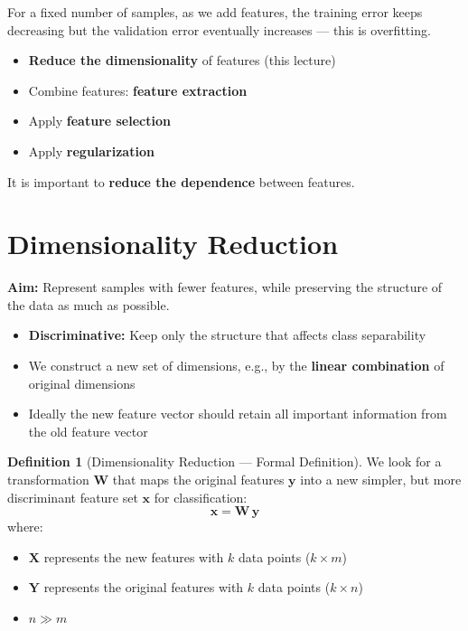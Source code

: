 \documentclass[11pt,a4paper]{article}
\theoremstyle{definition}
\newtheorem{definition}{Definition}[section]
\theoremstyle{plain}
\theoremstyle{remark}
\begin{document}
For a fixed number of samples, as we add features, the training error keeps decreasing but the validation error eventually increases --- this is overfitting.

\begin{tcolorbox}[colback=blue!5!white,colframe=blue!75!black,title=\textbf{Mitigating Overfitting and the Curse of Dimensionality}]
\begin{itemize}
    \item \textbf{Reduce the dimensionality} of features (this lecture)
    \item Combine features: \textbf{feature extraction}
    \item Apply \textbf{feature selection}
    \item Apply \textbf{regularization}
\end{itemize}
It is important to \textbf{reduce the dependence} between features.
\end{tcolorbox}

\section{Dimensionality Reduction}

\textbf{Aim:} Represent samples with fewer features, while preserving the structure of the data as much as possible.
\begin{itemize}
    \item \textbf{Discriminative:} Keep only the structure that affects class separability
    \item We construct a new set of dimensions, e.g., by the \textbf{linear combination} of original dimensions
    \item Ideally the new feature vector should retain all important information from the old feature vector
\end{itemize}

\begin{definition}[Dimensionality Reduction --- Formal Definition]
We look for a transformation $\mathbf{W}$ that maps the original features $\mathbf{y}$ into a new simpler, but more discriminant feature set $\mathbf{x}$ for classification:
\[
\mathbf{x} = \mathbf{W} \, \mathbf{y}
\]
where:
\begin{itemize}
    \item $\mathbf{X}$ represents the new features with $k$ data points ($k \times m$)
    \item $\mathbf{Y}$ represents the original features with $k$ data points ($k \times n$)
    \item $n \gg m$
\end{itemize}
\end{definition}
\end{document}
